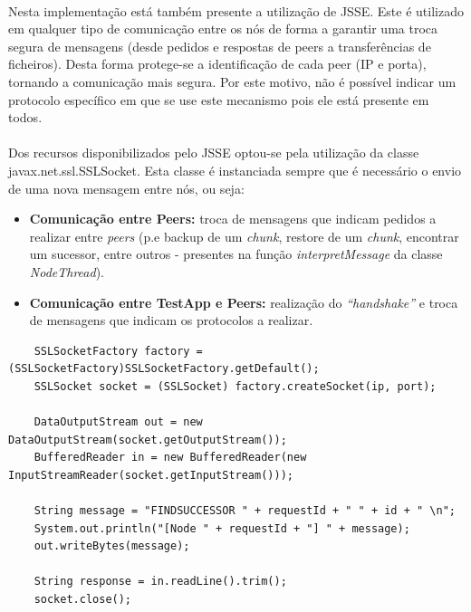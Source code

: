 \documentclass[11pt,oneside]{book}
\begin{document}
\paragraph{}
    Nesta implementação está também presente a utilização de JSSE. Este é utilizado em qualquer 
    tipo de comunicação entre os nós de forma a garantir uma troca segura de mensagens (desde 
    pedidos e respostas de peers a transferências de ficheiros). Desta forma protege-se a 
    identificação de cada peer (IP e porta), tornando a comunicação mais segura. Por este motivo, 
    não é possível indicar um protocolo específico em que se use este mecanismo pois ele está 
    presente em todos.

\paragraph{}
    Dos recursos disponibilizados pelo JSSE optou-se pela utilização da classe javax.net.ssl.SSLSocket.
    Esta classe é instanciada sempre que é necessário o envio de uma nova mensagem entre nós, 
    ou seja:
    \begin{itemize}
        \item \textbf{Comunicação entre Peers:} troca de mensagens que indicam pedidos a realizar
        entre \textit{peers} (p.e backup de um \textit{chunk}, restore de um \textit{chunk},
        encontrar um sucessor, entre outros - presentes na função \textit{interpretMessage} da 
        classe \textit{NodeThread}).
        \item \textbf{Comunicação entre TestApp e Peers:} realização do \textit{“handshake”} e 
        troca de mensagens que indicam os protocolos a realizar.
    \end{itemize}

\begin{lstlisting}
    SSLSocketFactory factory = (SSLSocketFactory)SSLSocketFactory.getDefault();
    SSLSocket socket = (SSLSocket) factory.createSocket(ip, port);

    DataOutputStream out = new DataOutputStream(socket.getOutputStream());
    BufferedReader in = new BufferedReader(new InputStreamReader(socket.getInputStream()));

    String message = "FINDSUCCESSOR " + requestId + " " + id + " \n";
    System.out.println("[Node " + requestId + "] " + message);
    out.writeBytes(message);

    String response = in.readLine().trim();
    socket.close();
\end{lstlisting}
\end{document}
